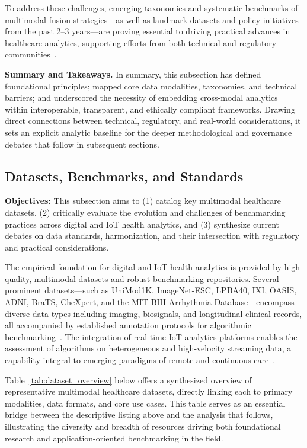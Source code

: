 \documentclass[sigconf]{acmart}
\begin{document}
\vspace{1ex}
To address these challenges, emerging taxonomies and systematic benchmarks of multimodal fusion strategies---as well as landmark datasets and policy initiatives from the past 2--3 years---are proving essential to driving practical advances in healthcare analytics, supporting efforts from both technical and regulatory communities~\cite{ref18,ref70,ref82,ref84,ref90,ref107}.

\vspace{1ex}
\noindent\textbf{Summary and Takeaways.} In summary, this subsection has defined foundational principles; mapped core data modalities, taxonomies, and technical barriers; and underscored the necessity of embedding cross-modal analytics within interoperable, transparent, and ethically compliant frameworks. Drawing direct connections between technical, regulatory, and real-world considerations, it sets an explicit analytic baseline for the deeper methodological and governance debates that follow in subsequent sections.

\subsection{Datasets, Benchmarks, and Standards}

\textbf{Objectives:} This subsection aims to (1) catalog key multimodal healthcare datasets, (2) critically evaluate the evolution and challenges of benchmarking practices across digital and IoT health analytics, and (3) synthesize current debates on data standards, harmonization, and their intersection with regulatory and practical considerations.

The empirical foundation for digital and IoT health analytics is provided by high-quality, multimodal datasets and robust benchmarking repositories. Several prominent datasets---such as UniMod1K, ImageNet-ESC, LPBA40, IXI, OASIS, ADNI, BraTS, CheXpert, and the MIT-BIH Arrhythmia Database---encompass diverse data types including imaging, biosignals, and longitudinal clinical records, all accompanied by established annotation protocols for algorithmic benchmarking~\cite{ref35,ref43,ref48,ref49,ref50,ref51,ref58,ref66,ref67,ref74,ref75,ref88,ref89,ref90,ref101,ref106}. The integration of real-time IoT analytics platforms enables the assessment of algorithms on heterogeneous and high-velocity streaming data, a capability integral to emerging paradigms of remote and continuous care~\cite{ref67,ref106}.

Table~\ref{tab:dataset_overview} below offers a synthesized overview of representative multimodal healthcare datasets, directly linking each to primary modalities, data formats, and core use cases. This table serves as an essential bridge between the descriptive listing above and the analysis that follows, illustrating the diversity and breadth of resources driving both foundational research and application-oriented benchmarking in the field.
\end{document}
